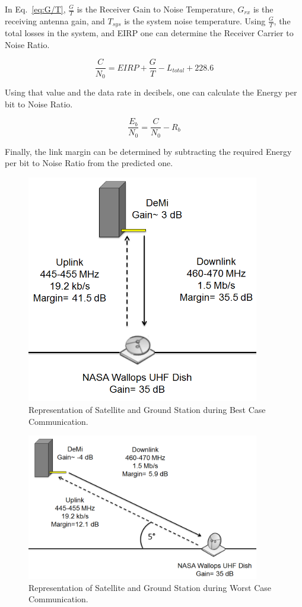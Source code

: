\documentclass[12pt]{article}
\begin{document}
In Eq.~\ref{eq:G/T}, $\frac{G}{T}$ is the Receiver Gain to Noise Temperature, $G_{rx}$ is the receiving antenna gain, and $T_{sys}$ is the system noise temperature. Using $\frac{G}{T}$, the total losses in the system, and EIRP one can determine \cite{SMAD} the Receiver Carrier to Noise Ratio.

\begin{equation}\label{eq:c/n}
\frac{C}{N_0} = EIRP + \frac{G}{T} - L_{total} + 228.6 
\end{equation}

Using that value and the data rate in decibels, one can calculate \cite{SMAD} the Energy per bit to Noise Ratio.

\begin{equation}\label{eq:eb/n}
\frac{E_b}{N_0} = \frac{C}{N_0} - R_b 
\end{equation}

Finally, the link margin can be determined by subtracting the required Energy per bit to Noise Ratio from the predicted one. 

\begin{figure}[ht]
\centering
  \includegraphics[width=4in]{images/comm-best.png}
\caption{Representation of Satellite and Ground Station during Best Case Communication.}
\label{fig:comm_best}
\end{figure}

\begin{figure}[ht]
\centering
  \includegraphics[width=4in]{images/comm-worst.png}
\caption{Representation of Satellite and Ground Station during Worst Case Communication.}
\label{fig:comm_worst}
\end{figure}
\end{document}
